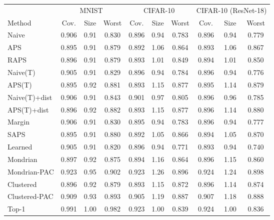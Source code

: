 \begin{tabular}{lccccccccc}
\toprule
 & \multicolumn{3}{c}{MNIST} & \multicolumn{3}{c}{CIFAR-10} & \multicolumn{3}{c}{CIFAR-10 (ResNet-18)} \\
\cmidrule(lr){2-4} \cmidrule(lr){5-7} \cmidrule(lr){8-10}
Method & Cov. & Size & Worst & Cov. & Size & Worst & Cov. & Size & Worst \\
\midrule
Naive & 0.906 & 0.91 & 0.830 & 0.896 & 0.94 & 0.783 & 0.896 & 0.94 & 0.779 \\
APS & 0.895 & 0.91 & 0.879 & 0.892 & 1.06 & 0.864 & 0.893 & 1.06 & 0.867 \\
RAPS & 0.896 & 0.91 & 0.879 & 0.893 & 1.01 & 0.849 & 0.894 & 1.01 & 0.850 \\
Naive(T) & 0.905 & 0.91 & 0.829 & 0.896 & 0.94 & 0.784 & 0.896 & 0.94 & 0.776 \\
APS(T) & 0.895 & 0.92 & 0.881 & 0.893 & 1.15 & 0.877 & 0.895 & 1.14 & 0.879 \\
Naive(T)+dist & 0.906 & 0.91 & 0.843 & 0.901 & 0.97 & 0.805 & 0.896 & 0.96 & 0.785 \\
APS(T)+dist & 0.896 & 0.92 & 0.882 & 0.893 & 1.15 & 0.877 & 0.896 & 1.14 & 0.880 \\
\addlinespace[2pt]
Margin & 0.906 & 0.91 & 0.830 & 0.895 & 0.94 & 0.783 & 0.896 & 0.94 & 0.777 \\
SAPS & 0.895 & 0.91 & 0.880 & 0.892 & 1.05 & 0.866 & 0.894 & 1.05 & 0.870 \\
Learned & 0.905 & 0.91 & 0.820 & 0.896 & 0.94 & 0.771 & 0.893 & 0.94 & 0.740 \\
\addlinespace[2pt]
Mondrian & 0.897 & 0.92 & 0.875 & 0.894 & 1.16 & 0.864 & 0.896 & 1.15 & 0.860 \\
Mondrian-PAC & 0.923 & 0.95 & 0.902 & 0.923 & 1.26 & 0.896 & 0.924 & 1.24 & 0.898 \\
Clustered & 0.896 & 0.92 & 0.879 & 0.893 & 1.15 & 0.872 & 0.896 & 1.14 & 0.874 \\
Clustered-PAC & 0.909 & 0.93 & 0.893 & 0.905 & 1.19 & 0.887 & 0.907 & 1.18 & 0.888 \\
Top-1 & 0.991 & 1.00 & 0.982 & 0.923 & 1.00 & 0.839 & 0.924 & 1.00 & 0.836 \\
\bottomrule
\end{tabular}
